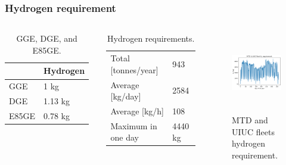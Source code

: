 \begin{frame}
\frametitle{Hydrogen requirement}
\begin{columns}
    \column[t]{5cm}
	\begin{table}[!htb]
		\centering
	    \caption{GGE, DGE, and E85GE.}
		\begin{tabular}{l|l}
		\hline
		                 & Hydrogen \\ \hline
		GGE              & 1 kg     \\
		DGE              & 1.13 kg  \\
		E85GE            & 0.78 kg  \\ \hline
        \end{tabular}
	\end{table}

	\begin{table}[!htb]
		\centering
	    \caption{Hydrogen requirements.}
		\begin{tabular}{l|l}
		\hline
		Total [tonnes/year]  & 943      \\
		Average [kg/day] 	 & 2584     \\
		Average [kg/h] 		 & 108      \\
		Maximum in one day   & 4440 kg  \\ \hline
        \end{tabular}
	\end{table}

	\column[t]{5cm}
	\begin{figure}[htbp!]
		\begin{center}
			\includegraphics[height=3.5cm]{images/hydro-fleet}
		\end{center}
		\caption{MTD and UIUC fleets hydrogen requirement.}
	\end{figure}

\end{columns}
\end{frame}


